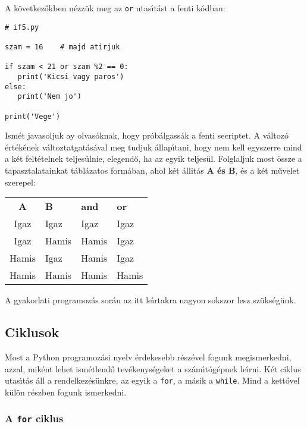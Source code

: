 \documentclass[12pt]{article}
\begin{document}
A k\"ovetkez\H{o}kben n\'ezz\"uk meg az {\tt or} utas\'{\i}t\'ast a fenti k\'odban:

\begin{Verbatim}[fontsize=\small]
# if5.py

szam = 16    # majd atirjuk

if szam < 21 or szam %2 == 0:
   print('Kicsi vagy paros')
else:
   print('Nem jo')

print('Vege')
\end{Verbatim}

Ism\'et javasoljuk ay olvas\'oknak, hogy pr\'ob\'algass\'ak a fenti secriptet. A v\'altoz\'o \'ert\'ek\'enek 
v\'altoztatgat\'as\'aval meg tudjuk \'allap\'{\i}tani, hogy nem kell egyszerre mind a k\'et felt\'etelnek 
teljes\"ulnie, elegend\H{o}, ha az egyik teljes\"ul. Folglaljuk most \"ossze a tapasztalatainkat t\'abl\'azatos 
form\'aban, ahol k\'et \'allit\'as {\bf{A} \'es \bf{B}}, \'es a k\'et m\H{u}velet szerepel:

\begin{center}
   \begin{tabular}{clll}
   {\bf A} & {\bf B} & {\bf and} & {\bf or} \\
   Igaz & Igaz & Igaz & Igaz \\
   Igaz & Hamis & Hamis & Igaz \\
   Hamis & Igaz & Hamis & Igaz \\
   Hamis & Hamis & Hamis & Hamis \\
   \end {tabular}
\end{center}

A gyakorlati programoz\'as sor\'an az itt le\'{\i}rtakra nagyon sokszor lesz sz\"uks\'eg\"unk.

\subsection{Ciklusok}

Most a Python programoz\'asi nyelv \'erdekesebb r\'esz\'evel fogunk megismerkedni, azzal, mik\'ent lehet ism\'etlend\H{o} 
tev\'ekenys\'egeket a sz\'am\'{\i}t\'og\'epnek le\'{\i}rni. K\'et ciklus utas\'{\i}t\'as \'all a rendelkez\'es\"unkre, 
az egyik a {\tt for}, a m\'asik a {\tt while}. Mind a kett\H{o}vel k\"ul\"on r\'eszben fogunk ismerkedni.

\subsubsection{A {\tt for} ciklus}
\end{document}
